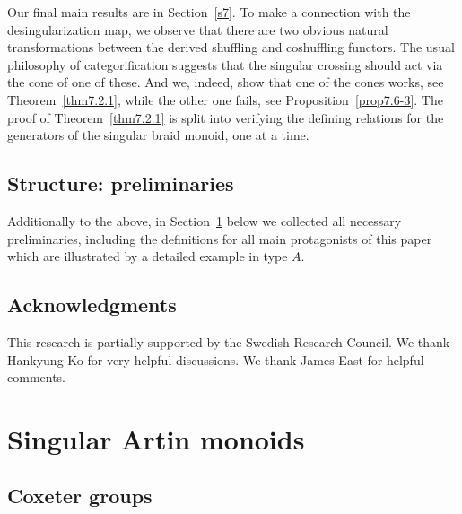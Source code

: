 \documentclass[a4paper]{amsart}
\begin{document}
Our final main results are in Section~\ref{s7}. To make a
connection with the desingularization map, we observe that there
are two obvious natural transformations between the derived
shuffling and coshuffling functors. The usual philosophy of 
categorification suggests that the singular crossing should
act via the cone of one of these. And we, indeed, show that 
one of the cones works, see Theorem~\ref{thm7.2.1}, while the other one
fails, see Proposition~\ref{prop7.6-3}. The proof of 
Theorem~\ref{thm7.2.1} is split into verifying the defining
relations for the generators of the singular braid monoid, 
one at a time.



\subsection{Structure: preliminaries}\label{s1.6}

Additionally to the above, in Section~\ref{s2} below we collected all
necessary preliminaries, including the definitions for all main protagonists
of this paper which are illustrated by a detailed example in type $A$.

\subsection*{Acknowledgments}
This research is partially supported by the Swedish Research Council.
We thank Hankyung Ko for very helpful discussions. 
We thank James East for helpful comments.


\section{Singular Artin monoids}\label{s2}



\subsection{Coxeter groups}\label{s2.2}
\end{document}
